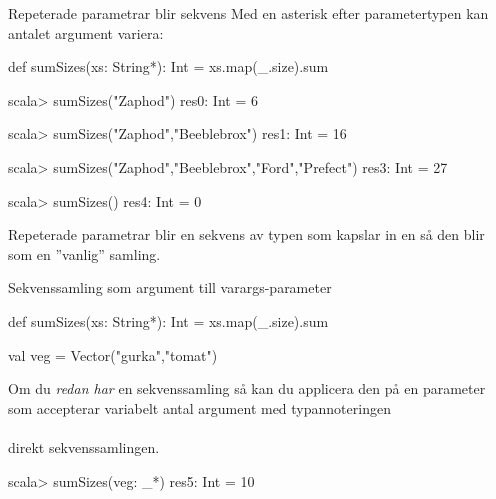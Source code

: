 


\begin{Slide}{Repeterade parametrar blir sekvens}\SlideFontSmall
Med en asterisk efter parametertypen kan antalet argument variera:
\begin{Code}[basicstyle=\fontsize{10}{12}\selectfont\ttfamily]
def sumSizes(xs: String*): Int = xs.map(_.size).sum
\end{Code}
\begin{REPLnonum}
scala> sumSizes("Zaphod")
res0: Int = 6

scala> sumSizes("Zaphod","Beeblebrox")
res1: Int = 16

scala> sumSizes("Zaphod","Beeblebrox","Ford","Prefect")
res3: Int = 27

scala> sumSizes()
res4: Int = 0
\end{REPLnonum}
Repeterade parametrar  blir en sekvens av typen  som kapslar in en  så den blir som en ''vanlig'' samling.
\end{Slide}

\begin{Slide}{Sekvenssamling som argument till varargs-parameter}
\begin{Code}[basicstyle=\fontsize{10}{12}\selectfont\ttfamily]
def sumSizes(xs: String*): Int = xs.map(_.size).sum

val veg = Vector("gurka","tomat")
\end{Code}
Om du \emph{redan har} en sekvenssamling så kan du applicera den på en parameter som accepterar variabelt antal argument med typannoteringen \\ {\vspace{1em}\Large\code{: _* }} \\ \vspace{1em}direkt  sekvenssamlingen.
\begin{REPLnonum}
scala> sumSizes(veg: _*)
res5: Int = 10
\end{REPLnonum}

\end{Slide}
